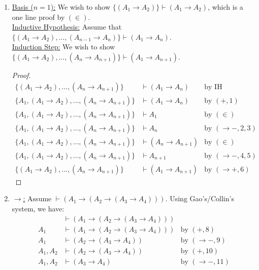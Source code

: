 \documentclass[12pt]{article}
\begin{document}
    \begin{enumerate}
        \item \underline{Basis ($n=1$):} We wish to show $\{(A_1\to A_2)\}\vdash (A_1\to A_2)$, which is a one line proof by $(\in)$.\\
                \underline{Inductive Hypothesis:} Assume that $\{(A_1\to A_2),\dots,(A_{n-1}\to A_n)\}\vdash (A_1\to A_n)$.\\
                \underline{Induction Step:} We wish to show $\{(A_1\to A_2),\dots,(A_n\to A_{n+1})\}\vdash (A_1\to A_{n+1})$.
                \begin{proof}
                    \begin{align}
                        \{(A_1\to A_2),\dots,(A_n\to A_{n+1})\} &\vdash (A_1\to A_n)&\text{by IH}\\
                        \{A_1,(A_1\to A_2),\dots,(A_n\to A_{n+1})\} &\vdash (A_1\to A_n)&\text{by }(+, 1)\\
                        \{A_1,(A_1\to A_2),\dots,(A_n\to A_{n+1})\} &\vdash A_1 &\text{by }(\in)\\
                        \{A_1,(A_1\to A_2),\dots,(A_n\to A_{n+1})\} &\vdash A_n&\text{by }(\to -, 2,3)\\
                        \{A_1,(A_1\to A_2),\dots,(A_n\to A_{n+1})\} &\vdash (A_n\to A_{n+1})&\text{by }(\in)\\
                        \{A_1,(A_1\to A_2),\dots,(A_n\to A_{n+1})\} &\vdash A_{n+1}&\text{by }(\to -, 4, 5)\\
                        \{(A_1\to A_2),\dots,(A_n\to A_{n+1})\} &\vdash (A_1\to A_{n+1})&\text{by }(\to +, 6)
                    \end{align}
                \end{proof}
        \item 
            \underline{$\to$:} Assume $\vdash (A_1\to (A_2\to (A_3\to A_4)))$. Using Gao's/Collin's system, we have:
            \begin{align}
                &\vdash (A_1\to (A_2\to (A_3\to A_4)))\\
                A_1 &\vdash (A_1\to (A_2\to (A_3\to A_4)))&\text{by }(+, 8) \\
                A_1 &\vdash (A_2\to (A_3\to A_4))&\text{by }(\to -, 9) \\
                A_1,A_2 &\vdash (A_2\to (A_3\to A_4))&\text{by }(+, 10) \\
                A_1,A_2 &\vdash (A_3\to A_4)&\text{by }(\to -, 11) \\

\end{align}
\end{enumerate}
\end{document}
